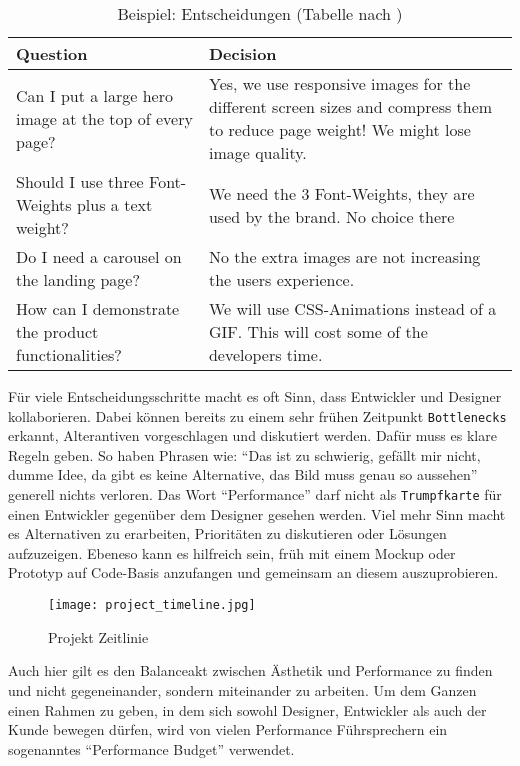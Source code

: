 			\begin{longtable}{|>{\raggedright \arraybackslash}p{7.6cm}|>{\raggedright \arraybackslash}p{7.6cm}|}
			\caption{Beispiel: Entscheidungen (Tabelle nach \autocite[p. 127]{laraHogan14})}\\
				\hline
				\textbf{Question} & \textbf{Decision}\\
				\hline
				Can I put a large hero image at the top of every page? & Yes, we use responsive images for the different screen sizes and compress them to reduce page weight! We might lose image quality.\\
				\hline
				Should I use three Font-Weights plus a text weight? & We need the 3 Font-Weights, they are used by the brand. No choice there\\
				\hline
				Do I need a carousel on the landing page? & No the extra images are not increasing the users experience.\\
				\hline
				How can I demonstrate the product functionalities? & We will use CSS-Animations instead of a GIF. This will cost some of the developers time.\\
				\hline	
			\end{longtable}

			Für viele Entscheidungsschritte macht es oft Sinn, dass Entwickler und Designer kollaborieren. Dabei können bereits zu einem sehr frühen Zeitpunkt \texttt{Bottlenecks} erkannt, Alterantiven vorgeschlagen und diskutiert werden. Dafür muss es klare Regeln geben. So haben Phrasen wie: "`Das ist zu schwierig, gefällt mir nicht, dumme Idee, da gibt es keine Alternative, das Bild muss genau so aussehen"' generell nichts verloren. Das Wort "`Performance"' darf nicht als \texttt{Trumpfkarte} für einen Entwickler gegenüber dem Designer gesehen werden. Viel mehr Sinn macht es Alternativen zu erarbeiten, Prioritäten zu diskutieren oder Lösungen aufzuzeigen. Ebeneso kann es hilfreich sein, früh mit einem Mockup oder Prototyp auf Code-Basis anzufangen und gemeinsam an diesem auszuprobieren.

			\begin{figure}[htbp]
				\texttt{[image: project\_timeline.jpg]}
				\caption{Projekt Zeitlinie}
				\label{fig:project_timeline}
			\end{figure}
			
			Auch hier gilt es den Balanceakt zwischen Ästhetik und Performance zu finden und nicht gegeneinander, sondern miteinander zu arbeiten. Um dem Ganzen einen Rahmen zu geben, in dem sich sowohl Designer, Entwickler als auch der Kunde bewegen dürfen, wird von vielen Performance Führsprechern ein sogenanntes "`Performance Budget"' verwendet.
		

